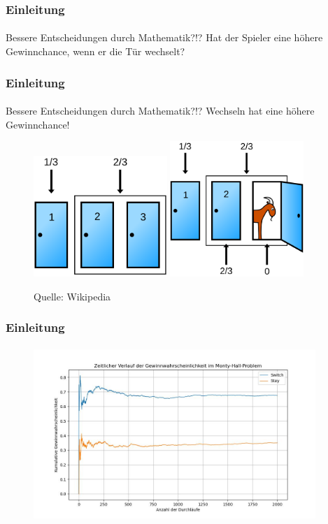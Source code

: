 \documentclass{beamer}
\begin{document}
\begin{frame}
    \frametitle{Einleitung}
\framesubtitle{}

\begin{block}{Bessere Entscheidungen durch Mathematik?!?}
Hat der Spieler eine höhere Gewinnchance, wenn er die Tür wechselt?
\end{block}

 \end{frame}

\begin{frame}
    \frametitle{Einleitung}
\framesubtitle{}

\begin{block}{Bessere Entscheidungen durch Mathematik?!?}
Wechseln hat eine höhere Gewinnchance!
\end{block}

\begin{figure}[htp]
      \centering
    \includegraphics[width=0.45\textwidth]{img/Monty_closed_1}
    \includegraphics[width=0.45\textwidth]{img/Monty_open_1}
      \caption{Quelle: Wikipedia}
\end{figure}

 \end{frame}



 \begin{frame}
    \frametitle{Einleitung}
\framesubtitle{}


\begin{figure}[htp]
      \centering
    \includegraphics[width=0.95\textwidth]{img/montyhall.jpg}
\end{figure}

 \end{frame}
\end{document}
